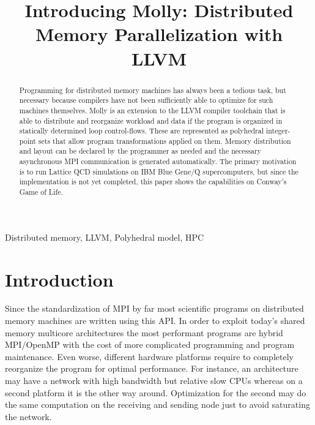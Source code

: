 \documentclass{sigplanconf}
\begin{document}
\setlength{\pdfpageheight}{\paperheight}
\setlength{\pdfpagewidth}{\paperwidth}










\title{Introducing Molly: Distributed Memory Parallelization with LLVM}




\authorinfo{}
           {}
           {}

\maketitle

\begin{abstract}
Programming for distributed memory machines has always been a tedious task, but necessary because compilers have not been sufficiently able to optimize for such machines themselves. Molly is an extension to the LLVM compiler toolchain that is able to distribute and reorganize workload and data if the program is organized in statically determined loop control-flows. These are represented as polyhedral integer-point sets that allow program transformations applied on them. Memory distribution and layout can be declared by the programmer as needed and the necessary asynchronous MPI communication is generated automatically. The primary motivation is to run Lattice QCD simulations on IBM Blue Gene/Q supercomputers, but since the implementation is not yet completed, this paper shows the capabilities on Conway's Game of Life.
\end{abstract}





\keywords
Distributed memory, LLVM, Polyhedral model, HPC


\section{Introduction}\label{sct:introduction}

Since the standardization of MPI by far most scientific programs on distributed memory machines are written using this API. In order to exploit today's shared memory multicore architectures the most performant programs are hybrid MPI/OpenMP with the cost of more complicated programming and program maintenance. Even worse, different hardware platforms require to completely reorganize the program for optimal performance. For instance, an architecture may have a network with high bandwidth but relative slow CPUs whereas on a second platform it is the other way around. Optimization for the second may do the same computation on the receiving and sending node just to avoid saturating the network.
\end{document}
